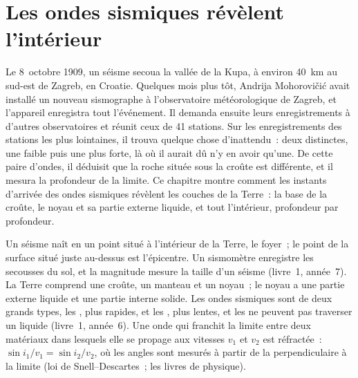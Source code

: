\chapter{Les ondes sismiques révèlent l'intérieur}\label{ch:g11:seismic-structure}

Le 8~octobre 1909, un séisme secoua la vallée de la Kupa, à environ
\qty{40}{km} au sud-est de Zagreb, en Croatie. Quelques mois plus tôt,
Andrija Mohorovičić avait installé un nouveau sismographe à l'observatoire
météorologique de Zagreb, et l'appareil enregistra tout l'événement. Il
demanda ensuite leurs enregistrements à d'autres observatoires et réunit
ceux de 41 stations. Sur les enregistrements des stations les plus
lointaines, il trouva quelque chose d'inattendu~: deux  distinctes,
une faible puis une plus forte, là où il aurait dû n'y en avoir qu'une. De
cette paire d'ondes, il déduisit que la roche située sous la croûte est
différente, et il mesura la profondeur de la limite. Ce chapitre montre
comment les instants d'arrivée des ondes sismiques révèlent les couches de
la Terre~: la base de la croûte, le noyau et sa partie externe liquide, et
tout l'intérieur, profondeur par profondeur.

\begin{recall}
Un séisme naît en un point situé à l'intérieur de la Terre, le foyer~; le
point de la surface situé juste au-dessus est l'épicentre. Un sismomètre
enregistre les secousses du sol, et la magnitude mesure la taille d'un
séisme (livre~1, année~7). La Terre comprend une croûte, un manteau et un
noyau~; le noyau a une partie externe liquide et une partie interne solide.
Les ondes sismiques sont de deux grands types, les , plus rapides, et
les , plus lentes, et les  ne peuvent pas traverser un liquide
(livre~1, année~6). Une onde qui franchit la limite entre deux matériaux
dans lesquels elle se propage aux vitesses $v_1$ et $v_2$ est réfractée~:
$\sin i_1/v_1 = \sin i_2/v_2$, où les angles sont mesurés à partir de la
perpendiculaire à la limite (loi de Snell--Descartes~; les livres de
physique).
\end{recall}

